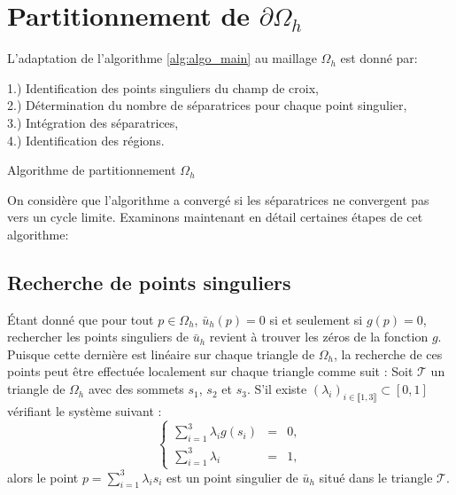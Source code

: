 \section{Partitionnement de $\partial\Omega_h$}

L'adaptation de l'algorithme \ref{alg:algo_main} au maillage $\Omega_h$ est donné par:\\

\begin{algorithm}[H]
\label{alg:discr_algo_main}
\vspace{0.2cm}
1.) Identification des points singuliers du champ de croix,\\\vspace{0.2cm}
2.) Détermination du nombre de séparatrices pour chaque point singulier,\\\vspace{0.2cm}
3.) Intégration des séparatrices,\\\vspace{0.2cm}
4.) Identification des régions.\\\vspace{0.2cm}
\caption{Algorithme de partitionnement $\Omega_h$}
\end{algorithm}
\vspace{0.5cm}
On considère que l'algorithme a convergé si les séparatrices ne convergent pas vers un cycle limite. Examinons maintenant en détail certaines étapes de cet algorithme:

\subsection{Recherche de points singuliers}

Étant donné que pour tout $p\in\Omega_h$, $\bar{u}_h(p)=0$ si et seulement si $g(p)=0$, rechercher les points singuliers de $\bar{u}_h$ revient à trouver les zéros de la fonction $g$. Puisque cette dernière est linéaire sur chaque triangle de $\Omega_h$, la recherche de ces points peut être effectuée localement sur chaque triangle comme suit : Soit $\mathcal{T}$ un triangle de $\Omega_h$ avec des sommets $s_1$, $s_2$ et $s_3$. S'il existe $(\lambda_i)_{i\in\llbracket 1, 3\rrbracket}\subset[0, 1]$ vérifiant le système suivant :
\begin{equation}
    \left\{
    \begin{array}{lcl}
    \displaystyle\sum_{i=1}^3\lambda_i g(s_i) & = & 0,\\[0.3cm]
    \displaystyle\sum_{i=1}^3\lambda_i & = & 1,
    \end{array}
    \right.
\end{equation}
alors le point $p=\sum_{i=1}^3\lambda_i s_i$ est un point singulier de $\bar{u}_h$ situé dans le triangle $\mathcal{T}$.\\

